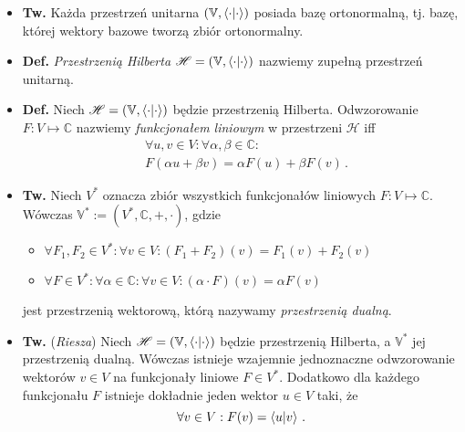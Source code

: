 \documentclass{myclass}
\begin{document}
\begin{itemize}
    \item \textbf{Tw.} Każda przestrzeń unitarna \((\mathbb{V}, \braket{\cdot})\) posiada bazę
    ortonormalną, tj. bazę, której wektory bazowe tworzą zbiór ortonormalny.

    \item \textbf{Def.} \textit{Przestrzenią Hilberta} \(\mathscr{H}=(\mathbb{V},\braket{\cdot})\)
    nazwiemy zupełną przestrzeń unitarną.

    \item \textbf{Def.} Niech \(\mathscr{H} = (\mathbb{V},\braket{\cdot})\) będzie przestrzenią
    Hilberta. Odwzorowanie \(F:V\mapsto\mathbb{C}\) nazwiemy \textit{funkcjonałem liniowym} w
    przestrzeni \(\mathscr{H}\) iff
    \begin{equation*}
        \begin{split}
            &\forall u,v \in V : \forall \alpha, \beta \in \mathbb{C} : \\
            &F(\alpha u+\beta v) = \alpha F(u) + \beta F(v)\,.
        \end{split}  
    \end{equation*}

    \item \textbf{Tw.} Niech \(V^*\) oznacza zbiór wszystkich funkcjonałów liniowych
    \(F:V\mapsto\mathbb{C}\). Wówczas \(\mathbb{V}^*:=(V^*,\mathbb{C},+,\cdot)\), gdzie
    \begin{itemize}
        \item \(\forall F_1,F_2 \in V^* : \forall v \in V : (F_1+F_2)(v) = F_1(v) + F_2(v)\)

        \item \(\forall F \in V^* : \forall \alpha \in \mathbb{C} : \forall v \in V : (\alpha \cdot
        F)(v) = \alpha F(v)\)
    \end{itemize}
    jest przestrzenią wektorową, którą nazywamy \textit{przestrzenią dualną}.

    \item \textbf{Tw.} (\textit{Riesza}) Niech \(\mathscr{H}=(\mathbb{V},\braket{\cdot})\) będzie
    przestrzenią Hilberta, a \(\mathbb{V}^*\) jej przestrzenią dualną. Wówczas istnieje wzajemnie
    jednoznaczne odwzorowanie wektorów \(v \in V\) na funkcjonały liniowe \(F \in V^*\). Dodatkowo
    dla każdego funkcjonału \(F\) istnieje dokładnie jeden wektor \(u \in V\) taki, że
    \begin{equation*}
        \forall v \in V : F(v) = \braket{u}{v}\,.
    \end{equation*}


\end{itemize}
\end{document}
